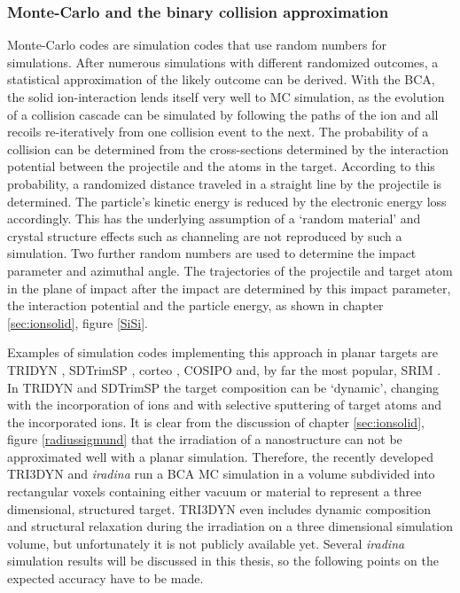 \subsubsection{Monte-Carlo and the binary collision approximation}

Monte-Carlo codes are simulation codes that use random numbers for simulations. After numerous simulations with different randomized outcomes, a statistical approximation of the likely outcome can be derived. With the BCA, the solid ion-interaction lends itself very well to MC simulation, as the evolution of a collision cascade can be simulated by following the paths of the ion and all recoils re-iteratively from one collision event to the next. The probability of a collision can be determined from the cross-sections determined by the interaction potential between the projectile and the atoms in the target. According to this probability, a randomized distance traveled in a straight line by the projectile is determined. The particle's kinetic energy is reduced by the electronic energy loss accordingly. This has the underlying assumption of a `random material' and crystal structure effects such as channeling are not reproduced by such a simulation. Two further random numbers are used to determine the impact parameter and azimuthal angle. The trajectories of the projectile and target atom in the plane of impact after the impact are determined by this impact parameter, the interaction potential and the particle energy, as shown in chapter \ref{sec:ionsolid}, figure \ref{SiSi}.

Examples of simulation codes implementing this approach in planar targets are TRIDYN \cite{moller_tridyn_1984}, SDTrimSP \cite{bizyukov_morphology_2008}, corteo \cite{schiettekatte_fast_2008}, COSIPO \cite{hautala_nuclear_1984} and, by far the most popular, SRIM \cite{ziegler_srim_2012}. In TRIDYN and SDTrimSP the target composition can be `dynamic', changing with the incorporation of ions and with selective sputtering of target atoms and the incorporated ions. It is clear from the discussion of chapter \ref{sec:ionsolid}, figure \ref{radiussigmund} that the irradiation of a nanostructure can not be approximated well with a planar simulation. Therefore, the recently developed TRI3DYN \cite{moller_tri3dyn_2014} and \emph{iradina} \cite{borschel_ion_2011} run a BCA MC simulation in a volume subdivided into rectangular voxels containing either vacuum or material to represent a three dimensional, structured target. TRI3DYN even includes dynamic composition and structural relaxation during the irradiation on a three dimensional simulation volume, but unfortunately it is not publicly available yet. Several \emph{iradina} simulation results will be discussed in this thesis, so the following points on the expected accuracy have to be made. 

